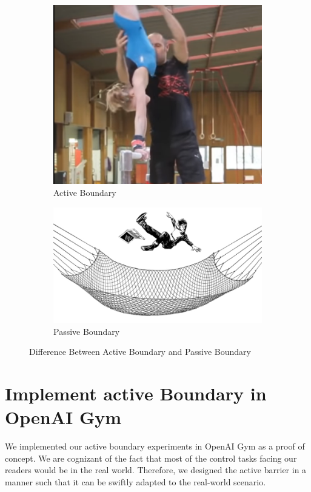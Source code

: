 \documentclass[journal]{IEEEtran}
\begin{document}
\begin{figure}
\centering
\begin{subfigure}{0.25\textwidth}
  \centering
  \includegraphics[width=\linewidth]{training1.png}
  \caption{Active Boundary}
\end{subfigure}%
\begin{subfigure}{.25\textwidth}
  \centering
  \includegraphics[width=\linewidth]{training2.png}
  \caption{Passive Boundary}
\end{subfigure}
\caption{Difference Between Active Boundary and Passive Boundary}
\label{fig:athelete}
\end{figure}

\section{Implement active Boundary in OpenAI Gym}
We implemented our active boundary experiments in OpenAI Gym\cite{Brockman2016OpenAIG} as a proof of concept. We are cognizant of the fact that most of the control tasks facing our readers would be in the real world. Therefore, we designed the active barrier in a manner such that it can be swiftly adapted to the real-world scenario.
\end{document}
